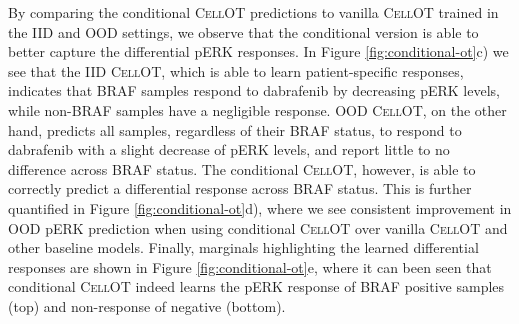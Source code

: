 By comparing the conditional \textsc{CellOT} predictions to vanilla \textsc{CellOT} trained in the IID and OOD settings, we observe that the conditional version is able to better capture the differential pERK responses.
In Figure \ref{fig:conditional-ot}c) we see that the IID \textsc{CellOT}, which is able to learn patient-specific responses, indicates that BRAF samples respond to dabrafenib by decreasing pERK levels, while non-BRAF samples have a negligible response.
OOD \textsc{CellOT}, on the other hand, predicts all samples, regardless of their BRAF status, to respond to dabrafenib with a slight decrease of pERK levels, and report little to no difference across BRAF status.
The conditional \textsc{CellOT}, however, is able to correctly predict a differential response across BRAF status.
This is further quantified in Figure \ref{fig:conditional-ot}d), where we see consistent improvement in OOD pERK prediction when using conditional \textsc{CellOT} over vanilla \textsc{CellOT} and other baseline models.
Finally, marginals highlighting the learned differential responses are shown in Figure \ref{fig:conditional-ot}e,
where it can been seen that conditional \textsc{CellOT} indeed learns the pERK response of BRAF positive samples (top) and non-response of negative (bottom).
